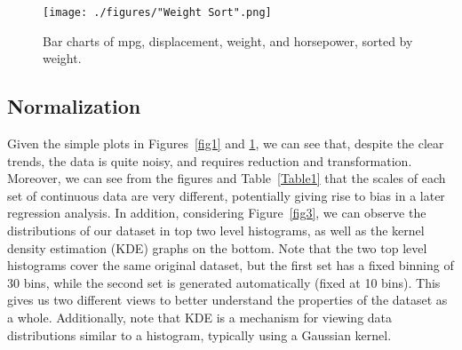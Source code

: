 \documentclass[10pt, conference, compsocconf]{IEEEtran}
\begin{document}
\begin{figure}[htb]
	\centering
	\texttt{[image: ./figures/"Weight Sort".png]}\\
	\vspace{0.04cm}
	\caption{Bar charts of mpg, displacement, weight, and horsepower, sorted by weight.}
	\vspace{0.01cm}
	\label{fig2}
\end{figure}


\subsection{Normalization}

Given the simple plots in Figures~\ref{fig1} and \ref{fig2}, we can see that, despite the clear trends, the data is quite noisy, and requires reduction and transformation. Moreover, we can see from the figures and Table~\ref{Table1} that the scales of each set of continuous data are very different, potentially giving rise to bias in a later regression analysis. In addition, considering Figure~\ref{fig3}, we can observe the distributions of our dataset in top two level histograms, as well as the kernel density estimation (KDE) graphs on the bottom. Note that the two top level histograms cover the same original dataset, but the first set has a fixed binning of 30 bins, while the second set is generated automatically (fixed at 10 bins). This gives us two different views to better understand the properties of the dataset as a whole. Additionally, note that KDE is a mechanism for viewing data distributions similar to a histogram, typically using a Gaussian kernel.  
\end{document}
